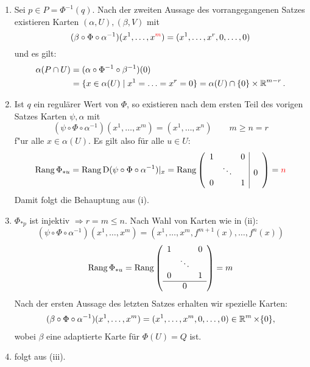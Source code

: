 \begin{bew}\begin{enumerate}[label=(\roman*),widest=iii,leftmargin=*]
\item
	Sei $p \in P = \Phi^{-1}(q)$. Nach der zweiten Aussage des vorrangegangenen Satzes existieren Karten $(\alpha,U), (\beta, V)$ mit 
		\[ (\beta \circ \Phi \circ \alpha^{-1})(x^1,\ldots,x^{\textcolor{red}{m}}) = (x^1, \ldots,x^r, 0, \ldots, 0) \]
	und es gilt:
	\begin{align*}
		\alpha(P \cap U) & = (\alpha \circ \Phi^{-1} \circ \beta^{-1})(0) \\
		& = \{x \in \alpha (U) \mid x^1 = \ldots = x^r = 0\} = \alpha(U) \cap \{0\} \times \operatorname{\mathbb{R}}^{m-r}.
	\end{align*} 
\item
	Ist $q$ ein regulärer Wert von $\Phi$, so existieren nach dem ersten Teil des vorigen Satzes Karten $\psi,\alpha$ mit 
		\[ (\psi \circ \Phi \circ \alpha^{-1})(x^1, \ldots, x^m) = (x^1, \ldots, x^n) \qquad m \geq n = r \]
	f"ur alle $x \in \alpha(U)$. Es gilt also für alle $u \in U$:
	\begin{align*}
		\operatorname{Rang} \Phi_{*u} = \operatorname{Rang} \operatorname{D}(\psi \circ \Phi \circ \alpha^{-1})|_x = \operatorname{Rang}
		\left(\begin{array}{ccc|c}
			1 &  & 0 & \\
			& \ddots & & 0 \\
			0 & & 1 & 
		\end{array}\right)
		= \textcolor{red}{n}
	\end{align*}
	Damit folgt die Behauptung aus (i).
\item
	$\Phi_{*p}$ ist injektiv $\Rightarrow r = m \leq n$. Nach Wahl von Karten wie in (ii):
		\[ (\psi \circ \Phi \circ \alpha^{-1})(x^1, \ldots, x^m) = (x^1, \ldots, x^m,f^{m+1}(x), \ldots, f^n(x)) \]
		\[\operatorname{Rang} \Phi_{*u} = \operatorname{Rang} 
			\left( \begin{array}{ccc}
				1 & & 0 \\
				& \ddots &  \\
				0 & & 1 \\
				\hline
				& 0      & 
			\end{array} \right)
		= m \]
	Nach der ersten Aussage des letzten Satzes erhalten wir spezielle Karten:
	\begin{align*}
		(\beta \circ \Phi \circ \alpha^{-1})(x^1, \ldots, x^m) = (x^1, \ldots, x^m, 0, \ldots, 0) \in \operatorname{\mathbb{R}}^{m} \times \{0\},
	\end{align*}
	wobei $\beta$ eine adaptierte Karte für $\Phi(U) = Q$ ist.
\item
	folgt aus (iii).
\end{enumerate}\end{bew}



